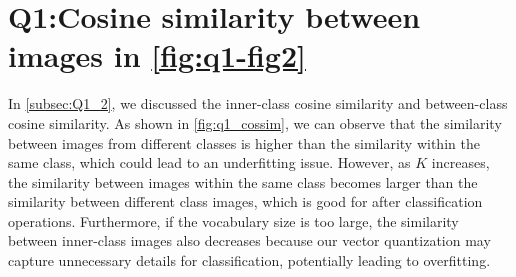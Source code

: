 \section{Q1:Cosine similarity between images in \cref{fig:q1-fig2}}
In \cref{subsec:Q1_2}, we discussed the inner-class cosine similarity and between-class cosine similarity. As shown in \cref{fig:q1_cossim}, we can observe that the similarity between images from different classes is higher than the similarity within the same class, which could lead to an underfitting issue. However, as $K$ increases, the similarity between images within the same class becomes larger than the similarity between different class images, which is good for after classification operations. Furthermore, if the vocabulary size is too large, the similarity between inner-class images also decreases because our vector quantization may capture unnecessary details for classification, potentially leading to overfitting.

